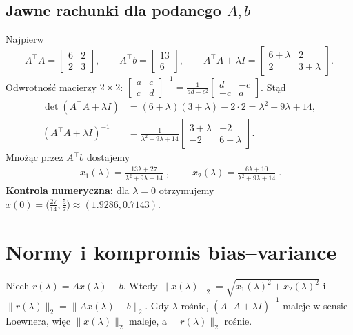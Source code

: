 \documentclass[12pt]{article}
\begin{document}
\subsection*{Jawne rachunki dla podanego \(A,b\)}
Najpierw
\[
A^{\top}A=\begin{bmatrix}6&2\\2&3\end{bmatrix},\qquad A^{\top}b=\begin{bmatrix}13\\6\end{bmatrix},\qquad
A^{\top}A+\lambda I=\begin{bmatrix}6+\lambda&2\\2&3+\lambda\end{bmatrix}.
\]
Odwrotność macierzy \(2\times2\): \(\begin{bmatrix}a&c\\c&d\end{bmatrix}^{-1}=\frac{1}{ad-c^2}\begin{bmatrix}d&-c\\-c&a\end{bmatrix}\). Stąd
\begin{align*}
\det(A^{\top}A+\lambda I)&=(6+\lambda)(3+\lambda)-2\cdot 2=\lambda^2+9\lambda+14,\\
(A^{\top}A+\lambda I)^{-1}&=\frac{1}{\lambda^2+9\lambda+14}\begin{bmatrix}3+\lambda&-2\\-2&6+\lambda\end{bmatrix}.
\end{align*}
Mnożąc przez \(A^{\top}b\) dostajemy
\begin{align*}
\boxed{\;x_1(\lambda)=\frac{13\lambda+27}{\lambda^2+9\lambda+14}\;},\qquad
\boxed{\;x_2(\lambda)=\frac{6\lambda+10}{\lambda^2+9\lambda+14}\;}. 
\end{align*}
\textbf{Kontrola numeryczna:} dla \(\lambda=0\) otrzymujemy \(x(0)=\big(\tfrac{27}{14},\tfrac{5}{7}\big)\approx(1.9286,0.7143)\).

\section*{Normy i kompromis bias--variance}
Niech \(r(\lambda)=Ax(\lambda)-b\). Wtedy \(\|x(\lambda)\|_2=\sqrt{x_1(\lambda)^2+x_2(\lambda)^2}\) i \(\|r(\lambda)\|_2=\|Ax(\lambda)-b\|_2\). Gdy \(\lambda\) rośnie, \((A^{\top}A+\lambda I)^{-1}\) maleje w sensie Loewnera, więc \(\|x(\lambda)\|_2\) maleje, a \(\|r(\lambda)\|_2\) rośnie.
\end{document}
